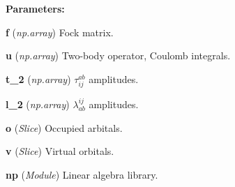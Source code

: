 \begin{tcolorbox}
{\begin{adjustwidth}{4em}{}
        \textbf{Parameters:}

            \hspace{1.5em} \textbf{f} (\emph{np.array}) Fock matrix.

            \hspace{1.5em} \textbf{u} (\emph{np.array})
                Two-body operator, Coulomb integrals. 

            \hspace{1.5em} \textbf{t\_2} (\emph{np.array}) $\tau^{ab}_{ij}$ amplitudes.

            \hspace{1.5em} \textbf{l\_2} (\emph{np.array}) $\lambda^{ij}_{ab}$ amplitudes.

            \hspace{1.5em} \textbf{o} (\emph{Slice}) Occupied arbitals.

            \hspace{1.5em} \textbf{v} (\emph{Slice}) Virtual orbitals.

            \hspace{1.5em} \textbf{np} (\emph{Module}) Linear algebra library.

        \end{adjustwidth}

    } 
\end{tcolorbox}